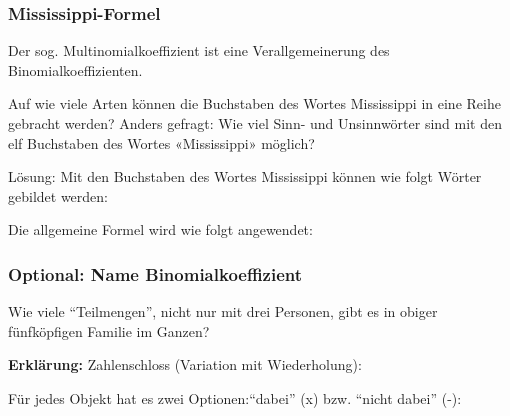 \subsubsection{Mississippi-Formel}
Der sog. Multinomialkoeffizient ist eine Verallgemeinerung des Binomialkoeffizienten.

Auf wie viele Arten können die Buchstaben des Wortes Mississippi in
eine Reihe gebracht werden? Anders gefragt: Wie viel Sinn- und
Unsinnwörter sind mit den elf Buchstaben des Wortes «Mississippi»
möglich?

Lösung: Mit den Buchstaben des Wortes
{\color{red}M}{\color{blue}i}{\color{orange}ss}{\color{blue}i}{\color{orange}ss}{\color{blue}i}{\color{violet}pp}{\color{blue}i}
können wie folgt Wörter gebildet werden:


Die allgemeine Formel wird wie folgt angewendet:

\subsubsection{Optional: Name Binomialkoeffizient}

 Wie viele ``Teilmengen'', nicht nur mit drei Personen, gibt es in obiger
  fünfköpfigen Familie im Ganzen?

    

\textbf{Erklärung:} Zahlenschloss (Variation mit Wiederholung):

Für jedes Objekt hat es zwei Optionen:``dabei'' (x) bzw. ``nicht dabei'' (-):

